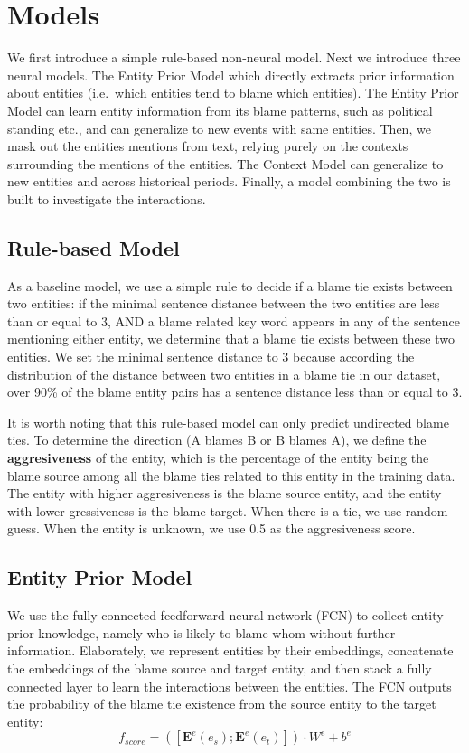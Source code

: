 \documentclass[letterpaper]{article} %
\begin{document}
\section{Models}

We first introduce a simple rule-based non-neural model. Next we introduce three neural models. The Entity Prior Model which directly extracts prior information about entities (i.e.\ which entities tend to blame which entities). The Entity Prior Model can learn entity information from its blame patterns, such as political standing etc., and can generalize to new events with same entities. Then, we mask out the entities mentions from text, relying purely on the contexts surrounding the mentions of the entities. The Context Model can generalize to new entities and across historical periods. Finally, a model combining the two is built to investigate the interactions.

\subsection{Rule-based Model}
As a baseline model, we use a simple rule to decide if a blame tie exists between two entities: if the minimal sentence distance between the two entities are less than or equal to 3, AND a blame related key word appears in any of the sentence mentioning either entity, we determine that a blame tie exists between these two entities. We set the minimal sentence distance to 3 because according the distribution of the distance between two entities in a blame tie in our dataset, over 90\% of the blame entity pairs has a sentence distance less than or equal to 3.

It is worth noting that this rule-based model can only predict undirected blame ties. To determine the direction (A blames B or B blames A), we define the {\bf aggresiveness} of the entity, which is the percentage of the entity being the blame source among all the blame ties related to this entity in the training data. The entity with higher aggresiveness is the blame source entity, and the entity with lower gressiveness is the blame target. When there is a tie, we use random guess. When the entity is unknown, we use 0.5 as the aggresiveness score.

\subsection{Entity Prior Model}
\label{entitymodel}
We use the fully connected feedforward neural network (FCN) to collect entity prior knowledge, namely who is likely to blame whom without further information. Elaborately, we represent entities by their embeddings, concatenate the embeddings of the blame source and target entity, and then stack a fully connected layer to learn the interactions between the entities. The FCN outputs the probability of the blame tie existence from the source entity to the target entity: $$f_{score} = ([\mathbf{E}^e(e_s); \mathbf{E}^e(e_t)]) \cdot W^e + b^e $$
\end{document}

